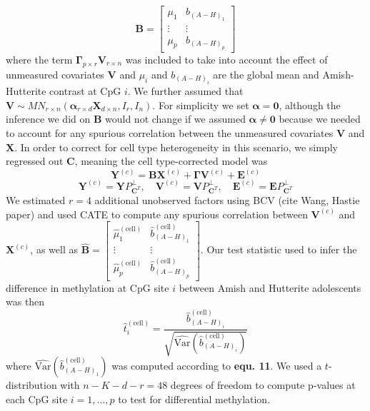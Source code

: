 \documentclass{article}
\begin{document}
\begin{equation}
\bm{B} = \left[ \begin{matrix}
\mu_1 & b_{(A-H)_1}\\
\vdots & \vdots\\
\mu_p & b_{(A-H)_p}
\end{matrix} \right]
\end{equation}
where the term $\bm{\Gamma}_{p \times r}\bm{V}_{r \times n}$ was included to take into account the effect of unmeasured covariates $\bm{V}$ and $\mu_i$ and $b_{(A-H)_i}$ are the global mean and Amish-Hutterite contrast at CpG $i$. We further assumed that $\bm{V} \sim MN_{r \times n}\left( \bm{\alpha}_{r \times d}\bm{X}_{d \times n}, I_r, I_n \right)$. For simplicity we set $\bm{\alpha} = \bm{0}$, although the inference we did on $\bm{B}$ would not change if we assumed $\bm{\alpha} \neq \bm{0}$ because we needed to account for any spurious correlation between the unmeasured covariates $\bm{V}$ and $\bm{X}$. In order to correct for cell type heterogeneity in this scenario, we simply regressed out $\bm{C}$, meaning the cell type-corrected model was
\begin{equation}
\bm{Y}^{(c)} = \bm{B}\bm{X}^{(c)} + \bm{\Gamma}\bm{V}^{(c)} + \bm{E}^{(c)}
\end{equation}
\begin{equation}
\bm{Y}^{(c)} = \bm{Y}P_{\bm{C}^T}^{\perp}, \quad \bm{V}^{(c)} = \bm{V}P_{\bm{C}^T}^{\perp}, \quad \bm{E}^{(c)} = \bm{E}P_{\bm{C}^T}^{\perp}
\end{equation}
We estimated $r=4$ additional unobserved factors using BCV (cite Wang, Hastie paper) and used CATE to compute any spurious correlation between $\bm{V}^{(c)}$ and $\bm{X}^{(c)}$, as well as $\hat{\bm{B}} = \left[ \begin{matrix}
\hat{\mu}_1^{(\text{cell})} & \hat{b}_{(A-H)_1}^{(\text{cell})}\\
\vdots & \vdots\\
\hat{\mu}_p^{(\text{cell})} & \hat{b}_{(A-H)_p}^{(\text{cell})}
\end{matrix} \right]$. Our test statistic used to infer the difference in methylation at CpG site $i$ between Amish and Hutterite adolescents was then
\begin{equation}
\hat{t}_i^{(\text{cell})} = \frac{\hat{b}_{(A-H)_i}^{(\text{cell})}}{\sqrt{\hat{\text{Var}}\left( \hat{b}_{(A-H)_i}^{(\text{cell})} \right)}}
\end{equation}
where $\hat{\text{Var}}\left(\hat{b}_{(A-H)_1}^{(\text{cell})} \right)$ was computed according to \textbf{equ. 11}. We used a $t$-distribution with $n - K - d - r = 48$ degrees of freedom to compute p-values at each CpG site $i = 1, \ldots, p$ to test for differential methylation.\\ 
\end{document}
